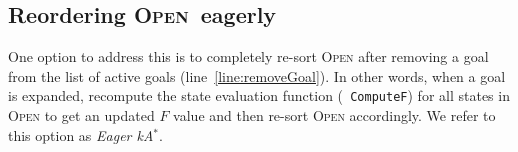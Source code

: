 \documentclass{aicom2e}
\newcommand{\kgs}{$k$GP}
\newcommand{\kastar}{kA$^*$}
\newcommand{\kastarmin}{kA$^*_{min}$}
\newcommand{\kastarmax}{kA$^*_{max}$}
\newcommand{\open}{\textsc{Open}}
\begin{document}







\subsection{Reordering \open\ eagerly}

One option to address this is to completely re-sort \open{} after removing a
goal from the list of active goals (line~\ref{line:removeGoal}). In other
words, when a goal is expanded, recompute the state evaluation function ({\tt
ComputeF}) for all states in \open{} to get an updated $F$ value and then
re-sort \open{} accordingly. We refer to this option as {\em Eager \kastar{}}. 









\end{document}
